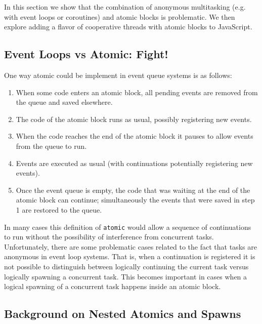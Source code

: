 \documentclass[acmsmall,anonymous,review]{acmart}\settopmatter{printfolios=true,printccs=false,printacmref=false}
\begin{document}

In this section we show that the combination of anonymous multitasking (e.g. with event loops or coroutines) and atomic blocks is problematic.
We then explore adding a flavor of cooperative threads with atomic blocks to JavaScript.

\subsection{Event Loops vs Atomic: Fight!}

One way atomic could be implement in event queue systems is as follows:

\begin{enumerate}
\item When some code enters an atomic block, all pending events are removed from the queue and saved elsewhere.
\item The code of the atomic block runs as usual, possibly registering new events.
\item When the code reaches the end of the atomic block it pauses to allow events from the queue to run.
\item Events are executed as usual (with continuations potentially registering new events).
\item Once the event queue is empty, the code that was waiting at the end of the atomic block can continue; simultaneously the events that were saved in step 1 are restored to the queue.
\end{enumerate}

In many cases this definition of \texttt{atomic} would allow a sequence of continuations to run without the possibility of interference from concurrent tasks.
Unfortunately, there are some problematic cases related to the fact that tasks are anonymous in event loop systems.
That is, when a continuation is registered it is not possible to distinguish between logically continuing the current task versus logically spawning a concurrent task.
This becomes important in cases when a logical spawning of a concurrent task happens inside an atomic block.

\subsection{Background on Nested Atomics and Spawns}
\end{document}
